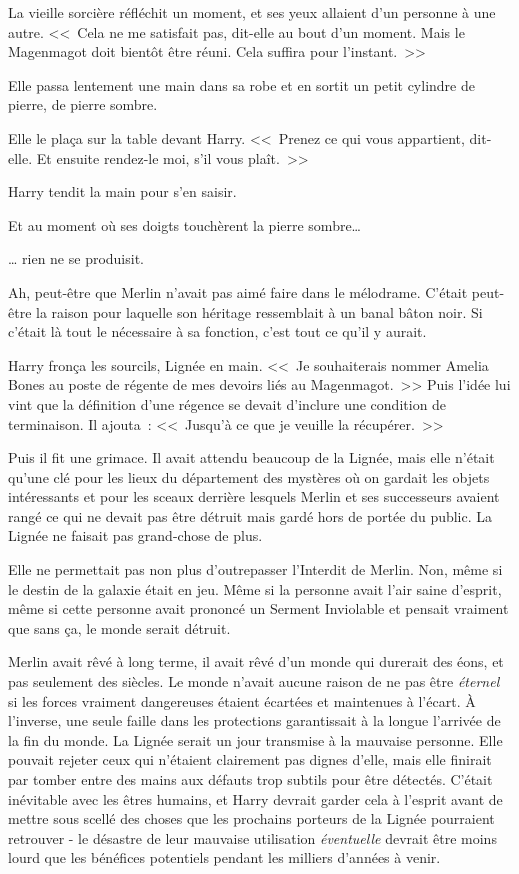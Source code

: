 La vieille sorcière réfléchit un moment, et ses yeux allaient d'un personne à une autre. <<~Cela ne me satisfait pas, dit-elle au bout d'un moment. Mais le Magenmagot doit bientôt être réuni. Cela suffira pour l'instant.~>>

Elle passa lentement une main dans sa robe et en sortit un petit cylindre de pierre, de pierre sombre.

Elle le plaça sur la table devant Harry. <<~Prenez ce qui vous appartient, dit-elle. Et ensuite rendez-le moi, s'il vous plaît.~>>

Harry tendit la main pour s'en saisir.

Et au moment où ses doigts touchèrent la pierre sombre…

… rien ne se produisit.

Ah, peut-être que Merlin n'avait pas aimé faire dans le mélodrame. C'était peut-être la raison pour laquelle son héritage ressemblait à un banal bâton noir. Si c'était là tout le nécessaire à sa fonction, c'est tout ce qu'il y aurait.

Harry fronça les sourcils, Lignée en main. <<~Je souhaiterais nommer Amelia Bones au poste de régente de mes devoirs liés au Magenmagot.~>> Puis l'idée lui vint que la définition d'une régence se devait d'inclure une condition de terminaison. Il ajouta~: <<~Jusqu'à ce que je veuille la récupérer.~>>

Puis il fit une grimace. Il avait attendu beaucoup de la Lignée, mais elle n'était qu'une clé pour les lieux du département des mystères où on gardait les objets intéressants et pour les sceaux derrière lesquels Merlin et ses successeurs avaient rangé ce qui ne devait pas être détruit mais gardé hors de portée du public. La Lignée ne faisait pas grand-chose de plus.

Elle ne permettait pas non plus d'outrepasser l'Interdit de Merlin. Non, même si le destin de la galaxie était en jeu. Même si la personne avait l'air saine d'esprit, même si cette personne avait prononcé un Serment Inviolable et pensait vraiment que sans ça, le monde serait détruit.

Merlin avait rêvé à long terme, il avait rêvé d'un monde qui durerait des éons, et pas seulement des siècles. Le monde n'avait aucune raison de ne pas être \emph{éternel} si les forces vraiment dangereuses étaient écartées et maintenues à l'écart. À l'inverse, une seule faille dans les protections garantissait à la longue l'arrivée de la fin du monde. La Lignée serait un jour transmise à la mauvaise personne. Elle pouvait rejeter ceux qui n'étaient clairement pas dignes d'elle, mais elle finirait par tomber entre des mains aux défauts trop subtils pour être détectés. C'était inévitable avec les êtres humains, et Harry devrait garder cela à l'esprit avant de mettre sous scellé des choses que les prochains porteurs de la Lignée pourraient retrouver - le désastre de leur mauvaise utilisation \emph{éventuelle} devrait être moins lourd que les bénéfices potentiels pendant les milliers d'années à venir.

